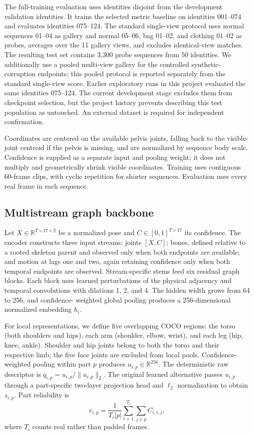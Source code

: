 \documentclass[pdflatex,iicol,sn-apa]{sn-jnl}
\newcommand{\R}{\mathbb{R}}
\begin{document}
The full-training evaluation uses identities disjoint from the development
validation identities. It trains
the selected metric baseline on identities 001--074 and evaluates identities
075--124. The standard single-view protocol uses normal sequences 01--04 as
gallery and normal 05--06, bag 01--02, and clothing 01--02 as probes, averages
over the 11 gallery views, and excludes identical-view matches. The resulting
test set contains 3,300 probe sequences from 50 identities. We additionally use
a pooled multi-view gallery for the controlled synthetic-corruption endpoints;
this pooled protocol is reported separately from the standard single-view score.
Earlier exploratory runs in this project evaluated the same identities 075--124.
The current development stage excludes them from checkpoint selection, but
the project history prevents describing this test population as untouched.
An external dataset is required for independent confirmation.

Coordinates are centered on the available pelvis joints, falling back to the
visible-joint centroid if the pelvis is missing, and are normalized by sequence
body scale. Confidence is supplied as a separate input and pooling weight; it
does not multiply and geometrically shrink visible coordinates. Training uses
contiguous 60-frame clips, with cyclic repetition for shorter sequences.
Evaluation uses every real frame in each sequence.

\subsection{Multistream graph backbone}

Let $X\in\R^{T\times17\times2}$ be a normalized pose and
$C\in[0,1]^{T\times17}$ its confidence. The encoder constructs three input
streams: joints $[X,C]$; bones, defined relative to a rooted skeleton parent and
observed only when both endpoints are available; and motion at lags one and two,
again retaining confidence only when both temporal endpoints are observed.
Stream-specific stems feed six residual graph blocks. Each block uses learned
perturbations of the physical adjacency and temporal convolutions with
dilations 1, 2, and 4. The hidden width grows from 64 to 256, and confidence-
weighted global pooling produces a 256-dimensional normalized embedding
$h_i$.

For local representations, we define five overlapping COCO regions: the torso
(both shoulders and hips), each arm (shoulder, elbow, wrist), and each leg
(hip, knee, ankle). Shoulder and hip joints belong to both the torso and their
respective limb; the five face joints are excluded from local pools. Confidence-weighted pooling within part
$p$ produces $u_{i,p}\in\R^{256}$. The deterministic raw descriptor is
$q_{i,p}=u_{i,p}/\lVert u_{i,p}\rVert_2$. The original learned alternative
passes $u_{i,p}$ through a part-specific two-layer projection head and
$\ell_2$ normalization to obtain $z_{i,p}$. Part reliability is
\begin{equation}
 r_{i,p}=\frac{1}{T_i|p|}\sum_{t=1}^{T_i}\sum_{j\in p}C_{i,t,j},
 \label{eq:reliability}
\end{equation}
where $T_i$ counts real rather than padded frames.
\end{document}
